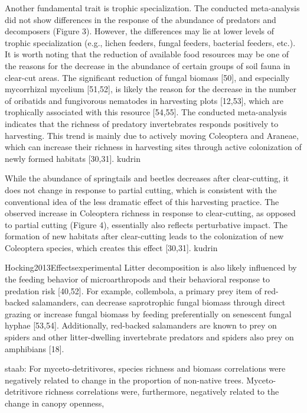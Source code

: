 Another fundamental trait is trophic specialization. The conducted meta-analysis did not show differences in the response of the abundance of predators and decomposers (Figure 3). However, the differences may lie at lower levels of trophic specialization (e.g., lichen feeders, fungal feeders, bacterial feeders, etc.). It is worth noting that the reduction of available food resources may be one of the reasons for the decrease in the abundance of certain groups of soil fauna in clear-cut areas. The significant reduction of fungal biomass [50], and especially mycorrhizal mycelium [51,52], is likely the reason for the decrease in the number of oribatids and fungivorous nematodes in harvesting plots [12,53], which are trophically associated with this resource [54,55]. The conducted meta-analysis indicates that the richness of predatory invertebrates responds positively to harvesting. This trend is mainly due to actively moving Coleoptera and Araneae, which can increase their richness in harvesting sites through active colonization of newly formed habitats [30,31]. kudrin 

While the abundance of springtails and beetles decreases after clear-cutting, it does not change in response to partial cutting, which is consistent with the conventional idea of the less dramatic effect of this harvesting practice. The observed increase in Coleoptera richness in response to clear-cutting, as opposed to partial cutting (Figure 4), essentially also reflects perturbative impact. The formation of new habitats after clear-cutting leads to the colonization of new Coleoptera species, which creates this effect [30,31]. kudrin

Hocking2013Effectsexperimental
Litter decomposition is also likely influenced by the feeding behavior of microarthropods and their behavioral response to predation risk [40,52]. For example, collembola, a primary prey item of red-backed salamanders, can decrease saprotrophic fungal biomass through direct grazing or increase fungal biomass by feeding preferentially on senescent fungal hyphae [53,54].
Additionally, red-backed salamanders are known to prey on spiders and other litter-dwelling invertebrate predators and spiders also prey on amphibians [18].

staab: 
For myceto-detritivores, species richness and biomass correlations were negatively related to change in the proportion of non-native trees. Myceto-detritivore richness correlations were, furthermore, negatively related to the change in canopy openness,

